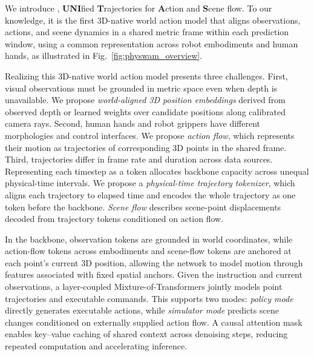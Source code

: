 We introduce \method{}, \textbf{UNI}fied \textbf{T}rajectories for
\textbf{A}ction and \textbf{S}cene flow.
To our knowledge, it is the first 3D-native world action model that
aligns observations, actions, and scene dynamics in a shared metric
frame within each prediction window, using a common representation
across robot embodiments and human hands, as illustrated in
Fig.~\ref{fig:physwam_overview}.

Realizing this 3D-native world action model presents three challenges.
First, visual observations must be grounded in metric space even
when depth is unavailable. We propose \emph{world-aligned 3D position embeddings} derived from observed depth or learned weights over
candidate positions along calibrated camera rays. Second, human hands and robot grippers have different morphologies
and control interfaces. We propose \emph{action flow}, which represents their motion as trajectories of corresponding 3D points in the shared frame. Third, trajectories differ in frame rate and duration across data sources. Representing each timestep as a token allocates backbone capacity
across unequal physical-time intervals. We propose a \emph{physical-time trajectory tokenizer}, which aligns each trajectory to elapsed time and encodes the whole trajectory as one token before the backbone.
\emph{Scene flow} describes scene-point displacements decoded from trajectory
tokens conditioned on action flow. 

In the backbone, observation tokens
are grounded in world coordinates, while action-flow tokens across
embodiments and scene-flow tokens are anchored at each point's current
3D position, allowing the network to model motion through features
associated with fixed spatial anchors.
Given the instruction and current observations, a layer-coupled
Mixture-of-Transformers jointly models point trajectories and executable
commands. This supports two modes: \emph{policy mode} directly generates
executable actions, while \emph{simulator mode} predicts scene changes
conditioned on externally supplied action flow.
A causal attention mask enables key--value caching of shared context
across denoising steps, reducing repeated computation and accelerating
inference.



